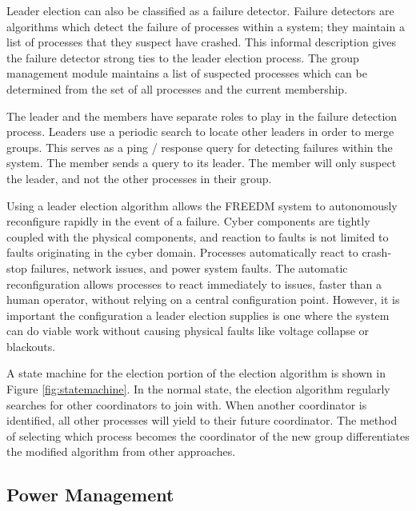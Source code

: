 Leader election can also be classified as a failure detector\cite{LEADERELECTIONEVAL}.
Failure detectors are algorithms which detect the failure of processes within a system; they maintain a list of processes that they suspect have crashed.
This informal description gives the failure detector strong ties to the leader election process. 
The group management module maintains a list of suspected processes which can be determined from the set of all processes and the current membership.

The leader and the members have separate roles to play in the failure detection process.
Leaders use a periodic search to locate other leaders in order to merge groups.
This serves as a ping / response query for detecting failures within the system.
The member sends a query to its leader.
The member will only suspect the leader, and not the other processes in their group.

Using a leader election algorithm allows the \ac{FREEDM} system to autonomously reconfigure rapidly in the event of a failure.
Cyber components are tightly coupled with the physical components, and reaction to faults is not limited to faults originating in the cyber domain.
Processes automatically react to crash-stop failures, network issues, and power system faults.
The automatic reconfiguration allows processes to react immediately to issues, faster than a human operator, without relying on a central configuration point.
However, it is important the configuration a leader election supplies is one where the system can do viable work without causing physical faults like voltage collapse or blackouts\cite{HARINI}.

A state machine for the election portion of the election algorithm is shown in Figure \ref{fig:statemachine}.
In the normal state, the election algorithm regularly searches for other coordinators to join with.
When another coordinator is identified, all other processes will yield to their future coordinator.
The method of selecting which process becomes the coordinator of the new group differentiates the modified algorithm from other approaches.

\subsection{Power Management}

